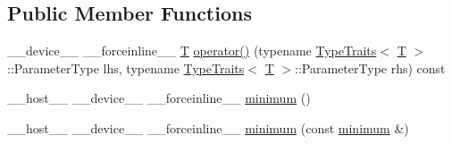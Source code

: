 \subsection*{Public Member Functions}
\begin{DoxyCompactItemize}
\item 
\-\_\-\-\_\-device\-\_\-\-\_\- \-\_\-\-\_\-forceinline\-\_\-\-\_\- \hyperlink{calib3d_8hpp_a3efb9551a871ddd0463079a808916717}{T} \hyperlink{structcv_1_1gpu_1_1device_1_1minimum_a938598560f0a543c0c8d0adbedbbe897}{operator()} (typename \hyperlink{structcv_1_1gpu_1_1device_1_1TypeTraits}{Type\-Traits}$<$ \hyperlink{calib3d_8hpp_a3efb9551a871ddd0463079a808916717}{T} $>$\-::Parameter\-Type lhs, typename \hyperlink{structcv_1_1gpu_1_1device_1_1TypeTraits}{Type\-Traits}$<$ \hyperlink{calib3d_8hpp_a3efb9551a871ddd0463079a808916717}{T} $>$\-::Parameter\-Type rhs) const 
\item 
\-\_\-\-\_\-host\-\_\-\-\_\- \-\_\-\-\_\-device\-\_\-\-\_\- \-\_\-\-\_\-forceinline\-\_\-\-\_\- \hyperlink{structcv_1_1gpu_1_1device_1_1minimum_a3971165b134d07925f87348cb9e726d5}{minimum} ()
\item 
\-\_\-\-\_\-host\-\_\-\-\_\- \-\_\-\-\_\-device\-\_\-\-\_\- \-\_\-\-\_\-forceinline\-\_\-\-\_\- \hyperlink{structcv_1_1gpu_1_1device_1_1minimum_a6044c2d2ac3c816e052b9daad3aeeeb9}{minimum} (const \hyperlink{structcv_1_1gpu_1_1device_1_1minimum}{minimum} \&)
\end{DoxyCompactItemize}


